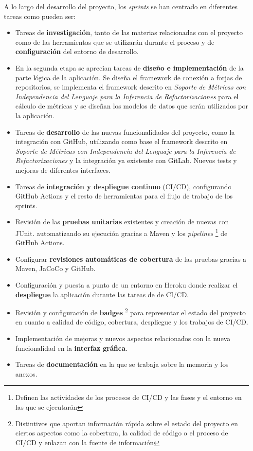 A lo largo del desarrollo del proyecto, los \textit{sprints} se han centrado en diferentes tareas como pueden ser:
\begin{itemize}
	\item  Tareas de \textbf{investigación}, tanto de las materias relacionadas con el proyecto como de las herramientas que se utilizarán durante el proceso y de \textbf{configuración} del entorno de desarrollo.
	\item En la segunda etapa se aprecian tareas de \textbf{diseño e implementación} de la parte lógica de la aplicación. Se diseña el framework de conexión a forjas de repositorios, se implementa el framework descrito en \textit{Soporte de Métricas con Independencia del Lenguaje para la Inferencia de Refactorizaciones}  \cite{marticorena_sanchez_soporte_2005} para el cálculo de métricas y se diseñan los modelos de datos que serán utilizados por la aplicación.
	\item Tareas de \textbf{desarrollo} de las nuevas funcionalidades del proyecto, como la integración con GitHub, utilizando como base el framework descrito en \textit{Soporte de Métricas con Independencia del Lenguaje para la Inferencia de Refactorizaciones}  \cite{marticorena_sanchez_soporte_2005} y la integración ya existente con GitLab. Nuevos tests y mejoras de diferentes interfaces.
	\item Tareas de \textbf{integración y despliegue continuo} (CI/CD), configurando GitHub Actions y el resto de herramientas para el flujo de trabajo de los sprints.
	\item Revisión de las \textbf{pruebas unitarias} existentes y creación de nuevas con JUnit. automatizando su ejecución gracias a Maven y los \textit{pipelines} \footnote{Definen las actividades de los procesos de CI/CD y las fases y el entorno en las que se ejecutarán} de GitHub Actions.
	\item Configurar \textbf{revisiones automáticas de cobertura} de las pruebas gracias a Maven, JaCoCo y GitHub.
	\item Configuración y puesta a punto de un entorno en Heroku donde realizar el \textbf{despliegue} la aplicación durante las tareas de de CI/CD.
	\item Revisión y configuración de \textbf{badges} \footnote{Distintivos que aportan información rápida sobre el estado del proyecto en ciertos aspectos como la cobertura, la calidad de código o el proceso de CI/CD y enlazan con la fuente de información} para representar el estado del proyecto en cuanto a calidad de código, cobertura, despliegue y los trabajos de CI/CD.
	\item Implementación de mejoras y nuevos aspectos relacionados con la nueva funcionalidad en la \textbf{interfaz gráfica}.
	\item Tareas de \textbf{documentación} en la que se trabaja sobre la memoria y los anexos.
\end{itemize}


